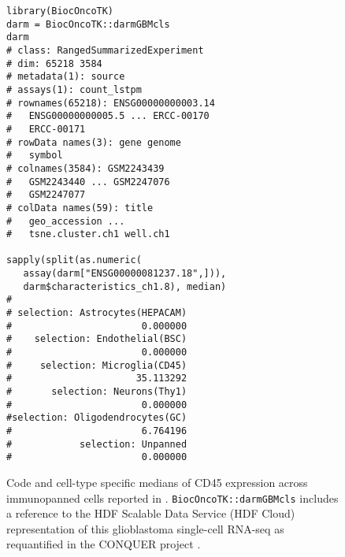 

\begin{figure}
\small{
\begin{verbatim}
library(BiocOncoTK)
darm = BiocOncoTK::darmGBMcls
darm
# class: RangedSummarizedExperiment 
# dim: 65218 3584 
# metadata(1): source
# assays(1): count_lstpm
# rownames(65218): ENSG00000000003.14
#   ENSG00000000005.5 ... ERCC-00170
#   ERCC-00171
# rowData names(3): gene genome
#   symbol
# colnames(3584): GSM2243439
#   GSM2243440 ... GSM2247076
#   GSM2247077
# colData names(59): title
#   geo_accession ...
#   tsne.cluster.ch1 well.ch1

sapply(split(as.numeric(
   assay(darm["ENSG00000081237.18",])), 
   darm$characteristics_ch1.8), median)
#
# selection: Astrocytes(HEPACAM) 
#                       0.000000 
#    selection: Endothelial(BSC) 
#                       0.000000 
#     selection: Microglia(CD45) 
#                      35.113292 
#       selection: Neurons(Thy1) 
#                       0.000000 
#selection: Oligodendrocytes(GC) 
#                       6.764196 
#            selection: Unpanned 
#                       0.000000 
\end{verbatim}
}
\caption{Code and cell-type specific
medians of CD45 expression across immunopanned
cells reported in \cite{Darmanis2017}.
\texttt{BiocOncoTK::darmGBMcls} includes
a reference to the HDF Scalable Data Service
(HDF Cloud) representation of
this glioblastoma single-cell RNA-seq
as requantified in the CONQUER project \citep{Soneson2018}.}
\label{hdffig}
\end{figure}

